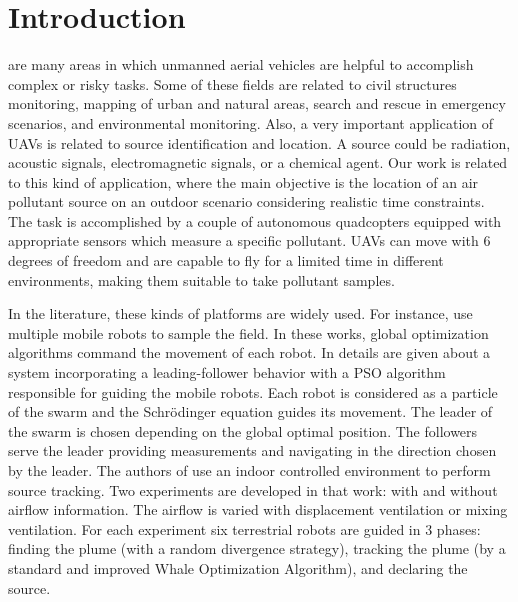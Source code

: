 \section{Introduction}
\label{sec:intro}
 are many areas in which unmanned aerial vehicles are helpful to accomplish complex or risky tasks.
Some of these fields are related to civil structures monitoring, mapping of urban and natural areas, search and rescue in emergency scenarios, and environmental monitoring. 
Also, a very important application of UAVs is related to source identification and location. 
A source could be radiation, acoustic signals, electromagnetic signals, or a chemical agent. 
Our work is related to this kind of application, where the main objective is the location of an air pollutant source on an outdoor scenario considering realistic time constraints. 
The task is accomplished by a couple of autonomous quadcopters equipped with appropriate sensors which measure a specific pollutant.
UAVs can move with 6 degrees of freedom and are capable to fly for a limited time in different environments, making them suitable to take pollutant samples.

In the literature, these kinds of platforms are widely used. 
For instance, \cite{li2020multi, yang2019towards, zou2015particle, nickels2019effective, chen2020combining, feng2019source} use multiple mobile robots to sample the field.
In these works, global optimization algorithms command the movement of each robot. In \cite{li2020multi} details are given about a system incorporating a leading-follower behavior with a PSO algorithm responsible for guiding the mobile robots.
Each robot is considered as a particle of the swarm and the Schrödinger equation guides its movement. 
The leader of the swarm is chosen depending on the global optimal position.
The followers serve the leader providing measurements and navigating in the direction chosen by the leader. 
The authors of \cite{yang2019towards} use an indoor controlled environment to perform source tracking. 
Two experiments are developed in that work: with and without airflow information. 
The airflow is varied with displacement ventilation or mixing ventilation. 
For each experiment six terrestrial robots are guided in 3 phases: finding the plume (with a random divergence strategy), tracking the plume (by a standard and improved Whale Optimization Algorithm), and declaring the source.


